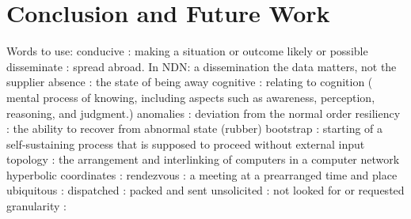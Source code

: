 \chapter{Conclusion and Future Work}\label{chp7:conclusion}

Words to use:
conducive : making a situation or outcome likely or possible
disseminate : spread abroad. 
In NDN: a dissemination the data matters, not the supplier
absence : the state of being away
cognitive : relating to cognition ( mental process of knowing, including aspects such as awareness, perception, reasoning, and judgment.)
anomalies : deviation from the normal order
resiliency : the ability to recover from abnormal state (rubber)
bootstrap : starting of a self-sustaining process that is supposed to proceed without external input
topology : the arrangement and interlinking of computers in a computer network
hyperbolic coordinates : 
rendezvous : a meeting at a prearranged time and place
ubiquitous : 
dispatched : packed and sent					
unsolicited : not looked for or requested
granularity : 
